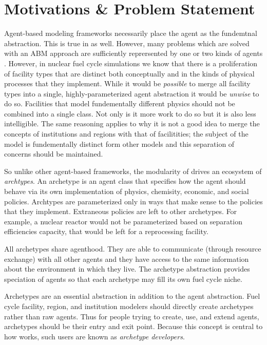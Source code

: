 \section{Motivations \& Problem Statement}
\label{sec-motive}

Agent-based modeling frameworks necessarily place the agent as the fundemtnal 
abstraction. This is true in \cyclus as well. However, many problems which are 
solved with an ABM approach are sufficiently reprersented by one or two kinds of 
agents \citeme. However, in nuclear fuel cycle simulations we know that there is
a proliferation of facility types that are distinct both conceptually and in the 
kinds of physical processes that they implement. While it would be \emph{possible}
to merge all facility types into a single, highly-parameterized agent abstraction
it would be \emph{unwise} to do so. Facilities that model fundementally different
physics should not be combined into a single class. Not only is it more work to 
do so but it is also less intelligible. The same reasoning applies to why it is 
not a good idea to merge the concepts of institutions and regions with that of
facilitities; the subject of the model is fundementally distinct form other models
and this separation of concerns should be maintained.

So unlike other agent-based frameworks, the modularity of \cyclus drives 
an ecosystem of \emph{archtypes}. An archetype is an agent class that specifies 
how the agent should behave via its own implementation of physics, chemisity, 
economic, and social policies. Archtypes are parameterized only in ways that 
make sense to the policies that they implement. Extraneous policies are left to 
other archetypes. For example, a nuclear reactor would not be parameterized based 
on separation efficiencies capacity, that would be left for a reprocessing facility.

All archetypes share agenthood. They are able to communicate (through resource 
exchange) with all other agents and they have access to the same information 
about the environment in which they live. The archetype abstraction provides
speciation of agents so that each archetype may fill its own fuel cycle niche.

Archetypes are an essential abstraction in addition to the agent abstraction. 
Fuel cycle facility, region, and institution modelers should directly create
archetypes rather than raw agents. Thus for people trying to create, use, and 
extend \cyclus agents, archetypes should be their entry and exit point. Because this 
concept is central to how \cyclus works, such users are known as \emph{archetype
developers}.

